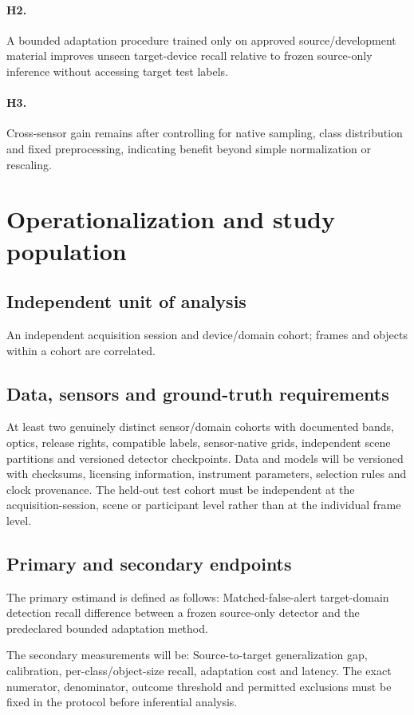 \documentclass[11pt,a4paper]{article}
\begin{document}
\paragraph{H2.} A bounded adaptation procedure trained only on approved source/development material improves unseen target-device recall relative to frozen source-only inference without accessing target test labels.

\paragraph{H3.} Cross-sensor gain remains after controlling for native sampling, class distribution and fixed preprocessing, indicating benefit beyond simple normalization or rescaling.

\section{Operationalization and study population}
\subsection{Independent unit of analysis}
An independent acquisition session and device/domain cohort; frames and objects within a cohort are correlated.

\subsection{Data, sensors and ground-truth requirements}
At least two genuinely distinct sensor/domain cohorts with documented bands, optics, release rights, compatible labels, sensor-native grids, independent scene partitions and versioned detector checkpoints. Data and models will be versioned with checksums, licensing information, instrument parameters, selection rules and clock provenance. The held-out test cohort must be independent at the acquisition-session, scene or participant level rather than at the individual frame level.

\subsection{Primary and secondary endpoints}
The primary estimand is defined as follows: Matched-false-alert target-domain detection recall difference between a frozen source-only detector and the predeclared bounded adaptation method.

The secondary measurements will be: Source-to-target generalization gap, calibration, per-class/object-size recall, adaptation cost and latency. The exact numerator, denominator, outcome threshold and permitted exclusions must be fixed in the protocol before inferential analysis.
\end{document}
